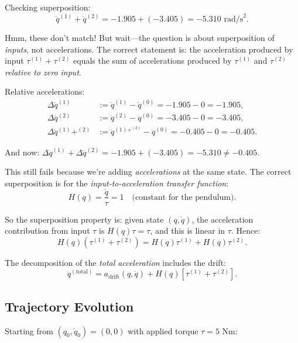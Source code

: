 Checking superposition:
\begin{equation}
\ddot q^{(1)} + \ddot q^{(2)} = -1.905 + (-3.405) = -5.310 \text{ rad/s}^2.
\end{equation}

Hmm, these don't match! But wait---the question is about superposition of \emph{inputs}, not
accelerations. The correct statement is: the acceleration produced by input $\tau^{(1)} + \tau^{(2)}$
equals the sum of accelerations produced by $\tau^{(1)}$ and $\tau^{(2)}$ \emph{relative to zero input}.

Relative accelerations:
\begin{align}
\Delta\ddot q^{(1)} &:= \ddot q^{(1)} - \ddot q^{(0)} = -1.905 - 0 = -1.905, \\
\Delta\ddot q^{(2)} &:= \ddot q^{(2)} - \ddot q^{(0)} = -3.405 - 0 = -3.405, \\
\Delta\ddot q^{(1)}+^{(2)} &:= \ddot q^{(1)+^{(2)}} - \ddot q^{(0)} = -0.405 - 0 = -0.405.
\end{align}

And now: $\Delta\ddot q^{(1)} + \Delta\ddot q^{(2)} = -1.905 + (-3.405) = -5.310 \neq -0.405$.

This still fails because we're adding \emph{accelerations} at the same state. The correct
superposition is for the \emph{input-to-acceleration transfer function}:
\begin{equation}
H(q) = \frac{\ddot q}{\tau} = 1 \quad \text{(constant for the pendulum)}.
\end{equation}

So the superposition property is: given state $(q, \dot q)$, the acceleration contribution
from input $\tau$ is $H(q)\tau = \tau$, and this is linear in $\tau$. Hence:
\begin{equation}
H(q)(\tau^{(1)} + \tau^{(2)}) = H(q)\tau^{(1)} + H(q)\tau^{(2)}.
\end{equation}

The decomposition of the \emph{total acceleration} includes the drift:
\begin{equation}
\ddot q^{(\text{total})} = a_{\text{drift}}(q,\dot q) + H(q)[\tau^{(1)} + \tau^{(2)}].
\end{equation}

\subsection{Trajectory Evolution}

Starting from $(q_0, \dot q_0) = (0, 0)$ with applied torque $\tau = 5$ N\textperiodcentered{}m:

